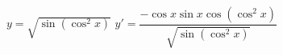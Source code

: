 {$y=\sqrt{\sin (\cos^2 x)}$
}
{$y'=\dfrac{-\cos x \sin x \cos (\cos^2 x)}{\sqrt{\sin (\cos^2 x)}}$
}
